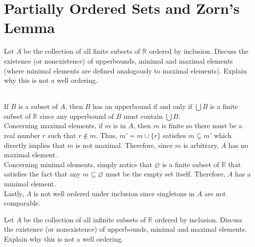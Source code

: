 \newpage

\section{Partially Ordered Sets and Zorn's Lemma}

\begin{exercise}
    Let $A$ be the collection of all finite subsets of $\mathbb{R}$ ordered by inclusion. Discuss the existence (or nonexistence) of upperbounds, minimal and maximal elements (where minimal elements are defined analogously to maximal elements). Explain why this is not a well ordering. \\
\end{exercise}

\begin{solution}
    \\ If $B$ is a subset of $A$, then $B$ has an upperbound if and only if $\bigcup B$ is a finite subset of $\mathbb{R}$ since any upperbound of $B$ must contain $\bigcup B$. \\
    Concerning maximal elements, if $m$ is in $A$, then $m$ is finite so there must be a real number $r$ such that $r \notin m$. Thus, $m' = m\cup\{r\}$ satisfies $m \subsetneq m'$ which directly implies that $m$ is not maximal. Therefore, since $m$ is arbitrary, $A$ has no maximal element.\\
    Concerning minimal elements, simply notice that $\varnothing$ is a finite subset of $\mathbb{R}$ that satisfies the fact that any $m \subseteq \varnothing$ must be the empty set itself. Therefore, $A$ has a minimal element. \\
    Lastly, $A$ is not well ordered under inclusion since singletons in $A$ are not comparable. \\
\end{solution}

\begin{exercise}
    Let $A$ be the collection of all infinite subsets of $\mathbb{R}$ ordered by inclusion. Discuss the existence (or nonexistence) of upperbounds, minimal and maximal elements. Explain why this is not a well ordering. \\
\end{exercise}

